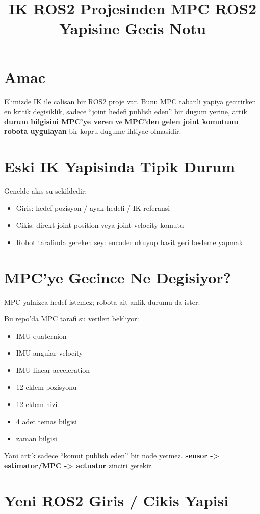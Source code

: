 \documentclass[11pt,a4paper]{article}
\title{IK ROS2 Projesinden MPC ROS2 Yapisine Gecis Notu}
\author{}
\date{}
\begin{document}
\maketitle

\section*{Amac}
Elimizde IK ile calisan bir ROS2 proje var. Bunu MPC tabanli yapiya gecirirken en kritik degisiklik, sadece ``joint hedefi publish eden'' bir dugum yerine, artik \textbf{durum bilgisini MPC'ye veren} ve \textbf{MPC'den gelen joint komutunu robota uygulayan} bir kopru dugume ihtiyac olmasidir.

\section*{Eski IK Yapisinda Tipik Durum}
Genelde akıs su sekildedir:
\begin{itemize}
  \item Giris: hedef pozisyon / ayak hedefi / IK referansi
  \item Cikis: direkt joint position veya joint velocity komutu
  \item Robot tarafinda gereken sey: encoder okuyup basit geri besleme yapmak
\end{itemize}

\section*{MPC'ye Gecince Ne Degisiyor?}
MPC yalnizca hedef istemez; robota ait anlik durumu da ister.

Bu repo'da MPC tarafi su verileri bekliyor:
\begin{itemize}
  \item IMU quaternion
  \item IMU angular velocity
  \item IMU linear acceleration
  \item 12 eklem pozisyonu
  \item 12 eklem hizi
  \item 4 adet temas bilgisi
  \item zaman bilgisi
\end{itemize}

Yani artik sadece ``komut publish eden'' bir node yetmez. \textbf{sensor -> estimator/MPC -> actuator} zinciri gerekir.

\section*{Yeni ROS2 Giris / Cikis Yapisi}
\end{document}
